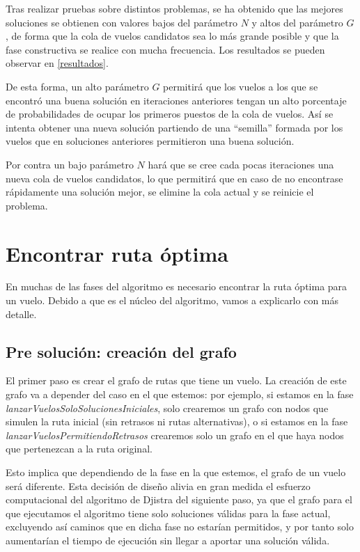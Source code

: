 Tras realizar pruebas sobre distintos problemas, se ha obtenido que las mejores soluciones se obtienen con valores bajos del parámetro $N$ y altos del parámetro $G$, de forma que la cola de vuelos candidatos sea lo más grande posible y que la fase constructiva se realice con mucha frecuencia. Los resultados se pueden observar en \autoref{resultados}.

De esta forma, un alto parámetro $G$ permitirá que los vuelos a los que se encontró una buena solución en iteraciones anteriores tengan un alto porcentaje de probabilidades de ocupar los primeros puestos de la cola de vuelos. Así se intenta obtener una nueva solución partiendo de una ``semilla'' formada por los vuelos que en soluciones anteriores permitieron una buena solución.

Por contra un bajo parámetro $N$ hará que se cree cada pocas iteraciones una nueva cola de vuelos candidatos, lo que permitirá que en caso de no encontrase rápidamente una solución mejor, se elimine la cola actual y se reinicie el problema.


\section{Encontrar ruta óptima}
En muchas de las fases del algoritmo es necesario encontrar la ruta óptima para un vuelo. Debido a que es el núcleo del algoritmo, vamos a explicarlo con más detalle.
\subsection{Pre solución: creación del grafo}
El primer paso es crear el grafo de rutas que tiene un vuelo. La creación de este grafo va a depender del caso en el que estemos: por ejemplo, si estamos en la fase \textit{lanzarVuelosSoloSolucionesIniciales}, solo crearemos un grafo con nodos que simulen la ruta inicial (sin retrasos ni rutas alternativas), o si estamos en la fase \textit{lanzarVuelosPermitiendoRetrasos} crearemos solo un grafo en el que haya nodos  que pertenezcan a la ruta original.

Esto implica que dependiendo de la fase en la que estemos, el grafo de un vuelo será diferente. Esta decisión de diseño alivia en gran medida el esfuerzo computacional del algoritmo de  Djistra del siguiente paso, ya que el grafo para el que ejecutamos el algoritmo tiene solo soluciones válidas para la fase actual, excluyendo así caminos que en dicha fase no estarían permitidos, y por tanto solo aumentarían el tiempo de ejecución sin llegar a aportar una solución válida.


